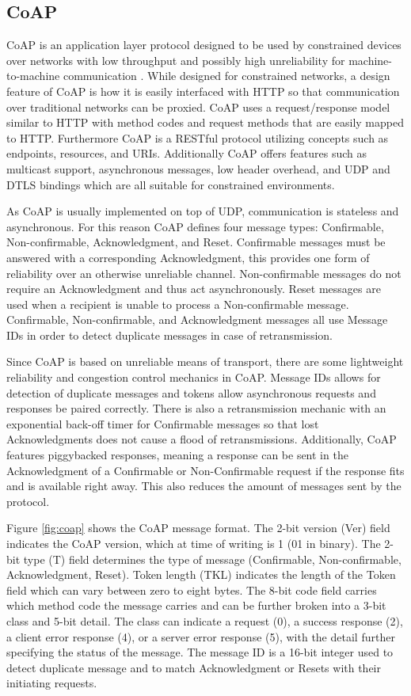 \documentclass[0-thesis.tex]{subfiles}
\begin{document}
\subsection{CoAP}
\label{ssec:coap}
CoAP is an application layer protocol designed to be used by constrained devices over
networks with low throughput and possibly high unreliability for machine-to-machine
communication \parencite{rfc7252}. While designed for constrained networks, a design
feature of CoAP is how it is easily interfaced with HTTP so that communication over
traditional networks can be proxied. CoAP uses a request/response model similar to HTTP
with method codes and request methods that are easily mapped to HTTP. Furthermore CoAP is
a RESTful protocol utilizing concepts such as endpoints, resources, and URIs. Additionally
CoAP offers features such as multicast support, asynchronous messages, low header
overhead, and UDP and DTLS bindings which are all suitable for constrained environments.

As CoAP is usually implemented on top of UDP, communication is stateless and asynchronous.
For this reason CoAP defines four message types: Confirmable, Non-confirmable,
Acknowledgment, and Reset. Confirmable messages must be answered with a corresponding
Acknowledgment, this provides one form of reliability over an otherwise unreliable
channel. Non-confirmable messages do not require an Acknowledgment and thus act
asynchronously. Reset messages are used when a recipient is unable to process a
Non-confirmable message. Confirmable, Non-confirmable, and Acknowledgment messages all
use Message IDs in order to detect duplicate messages in case of retransmission.

Since CoAP is based on unreliable means of transport, there are some lightweight
reliability and congestion control mechanics in CoAP. Message IDs allows for detection of
duplicate messages and tokens allow asynchronous requests and responses be paired
correctly. There is also a retransmission mechanic with an exponential back-off timer for
Confirmable messages so that lost Acknowledgments does not cause a flood of
retransmissions. Additionally, CoAP features piggybacked responses, meaning a response can
be sent in the Acknowledgment of a Confirmable or Non-Confirmable request if the response
fits and is available right away. This also reduces the amount of messages sent by the
protocol.

Figure \ref{fig:coap} shows the CoAP message format. The 2-bit version (Ver) field
indicates the CoAP version, which at time of writing is 1 (01 in binary). The 2-bit type
(T) field determines the type of message (Confirmable, Non-confirmable, Acknowledgment,
Reset). Token length (TKL) indicates the length of the Token field which can vary between
zero to eight bytes. The 8-bit code field carries which method code the message carries
and can be further broken into a 3-bit class and 5-bit detail. The class can indicate a
request (0), a success response (2), a client error response (4), or a server error
response (5), with the detail further specifying the status of the message. The message ID
is a 16-bit integer used to detect duplicate message and to match Acknowledgment or
Resets with their initiating requests.
\end{document}

